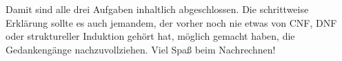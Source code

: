 \documentclass[a4paper,12pt]{article}
\begin{document}
\bigskip
\bigskip

Damit sind alle drei Aufgaben inhaltlich abgeschlossen. Die
schrittweise Erkl\"arung sollte es auch jemandem, der vorher noch nie
etwas von CNF, DNF oder struktureller Induktion geh\"ort hat,
m\"oglich gemacht haben, die Gedankeng\"ange nachzuvollziehen. Viel
Spa{\ss} beim Nachrechnen!
\end{document}
